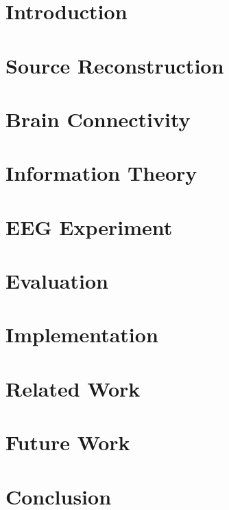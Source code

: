 \documentclass[master=mai, masteroption=ecs]{kulemt}
\begin{document}
\listoffigures

\mainmatter

\chapter{Introduction}


\chapter{Source Reconstruction}


\chapter{Brain Connectivity}


\chapter{Information Theory}\label{information-theory}


\chapter{EEG Experiment}


\chapter{Evaluation}\label{evaluation}


\chapter{Implementation}\label{implementation}


\chapter{Related Work}\label{related}


\chapter{Future Work}


\chapter{Conclusion}\label{conclusion}



\backmatter



\nocite{*}
\end{document}
